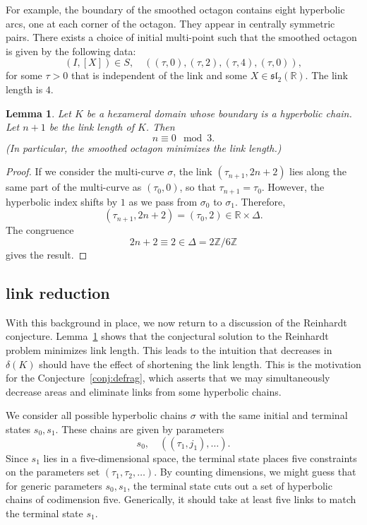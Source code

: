 \documentclass[11pt]{amsart}
\newtheorem{lemma}[equation]{Lemma}
\newcommand{\ring}[1]{\mathbb{#1}}
\def\deltalat{\mathbb\delta}  %
\def\rZ{{\ring{Z}}}
\def\rR{{\ring{R}}}
\def\ta{{\tau}}
\begin{document}
For example, the boundary of the smoothed octagon contains eight
hyperbolic arcs, one at each corner of the octagon. They appear in
centrally symmetric pairs.  There exists a choice of initial
multi-point such that the smoothed octagon is given by the following
data:
\[
(I,[X])\in S,\quad ((\ta,0),(\ta,2),(\ta,4),(\ta,0)),
\]
for some $\ta>0$ that is independent of the link and some
$X\in\mathfrak{sl}_2(\rR)$.
The link length is $4$.

\begin{lemma}\label{lemma:link}  
  Let $K$ be a hexameral domain whose boundary is a hyperbolic chain.
  Let $n+1$ be the link length of $K$.  Then
\[n\equiv 0 \mod 3.\]
(In particular, the smoothed octagon minimizes the link length.)
\end{lemma}

\begin{proof} If we consider the multi-curve $\sigma$, the link
$(\ta_{n+1},2n+2)$ lies along the same part of the multi-curve as $(\ta_0,0)$,
so that $\ta_{n+1}=\ta_0$.  However, the hyperbolic index shifts by
$1$ as we pass from $\sigma_0$ to $\sigma_1$.  Therefore,
\[(\ta_{n+1},2n+2) = (\ta_0,2)\in \rR\times \Delta.\]
The congruence 
\[2n+2 \equiv 2\in \Delta = 2\rZ/6\rZ\]
gives the result.
\end{proof}

\subsection{link reduction}

With this background in place, we now return to a discussion of the
Reinhardt conjecture.  Lemma~\ref{lemma:link} shows that the
conjectural solution to the Reinhardt problem minimizes link
length.  This leads to the intuition 
that decreases in $\deltalat(K)$ should have
the effect of shortening the link length.  This is the motivation
for the Conjecture~\ref{conj:defrag}, which asserts that we may
simultaneously decrease areas and eliminate links
from some hyperbolic chains.   

We consider all possible hyperbolic chains $\sigma$ with the same
initial and terminal states $s_0,s_1$.  These chains are given by
parameters
  \[
  s_0,\quad ((\ta_1,j_1),\ldots).
  \]
  Since $s_1$ lies in a five-dimensional space, the terminal state
  places five constraints on the parameters set
  $(\ta_1,\ta_2,\ldots)$.  By counting dimensions, we might guess that
  for generic parameters $s_0,s_1$, the terminal state cuts out a set
  of hyperbolic chains of codimension five.  Generically, it should
  take at least five links to match the terminal state $s_1$.
\end{document}
